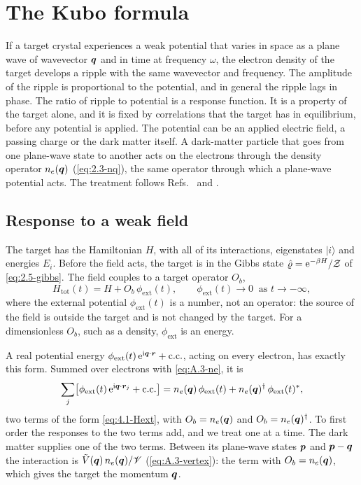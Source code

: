 \section{The Kubo formula}\label{sec:4.1}

If a target crystal experiences a weak potential that varies in space as a plane wave of wavevector $\bm{q}$ and in time at frequency $\omega$, the electron density of the target develops a ripple with the same wavevector and frequency. The amplitude of the ripple is proportional to the potential, and in general the ripple lags in phase. The ratio of ripple to potential is a response function. It is a property of the target alone, and it is fixed by correlations that the target has in equilibrium, before any potential is applied. The potential can be an applied electric field, a passing charge or the dark matter itself. A dark-matter particle that goes from one plane-wave state to another acts on the electrons through the density operator $n_e(\bm{q})$ (\cref{eq:2.3-nq}), the same operator through which a plane-wave potential acts. The treatment follows Refs.~\cite[Chap.~3]{giuliani2005quantum} and \cite[Chap.~6]{bruus2004many}.

\subsection{Response to a weak field}

The target has the Hamiltonian $H$, with all of its interactions, eigenstates $|i\rangle$ and energies $E_i$. Before the field acts, the target is in the Gibbs state $\hat{\varrho} = \mathrm{e}^{-\beta H}/\mathcal{Z}$ of \cref{eq:2.5-gibbs}. The field couples to a target operator $O_b$,
\begin{equation}
  H_{\mathrm{tot}}(t) = H + O_b\,\phi_{\mathrm{ext}}(t), \qquad \phi_{\mathrm{ext}}(t) \to 0 \ \text{ as } t \to -\infty ,
  \label{eq:4.1-Hext}
\end{equation}
where the external potential $\phi_{\mathrm{ext}}(t)$ is a number, not an operator: the source of the field is outside the target and is not changed by the target. For a dimensionless $O_b$, such as a density, $\phi_{\mathrm{ext}}$ is an energy.

A real potential energy $\phi_{\mathrm{ext}}(t)\,\mathrm{e}^{\mathrm{i}\bm{q}\cdot\bm{r}} + \text{c.c.}$, acting on every electron, has exactly this form. Summed over electrons with \cref{eq:A.3-ne}, it is
\begin{equation*}
  \sum_j\bigl[\phi_{\mathrm{ext}}(t)\,\mathrm{e}^{\mathrm{i}\bm{q}\cdot\bm{r}_j} + \text{c.c.}\bigr] = n_e(\bm{q})\,\phi_{\mathrm{ext}}(t) + n_e(\bm{q})^\dagger\,\phi_{\mathrm{ext}}(t)^* ,
\end{equation*}
two terms of the form \cref{eq:4.1-Hext}, with $O_b = n_e(\bm{q})$ and $O_b = n_e(\bm{q})^\dagger$. To first order the responses to the two terms add, and we treat one at a time. The dark matter supplies one of the two terms. Between its plane-wave states $\bm{p}$ and $\bm{p} - \bm{q}$ the interaction is $\tilde V(\bm{q})\,n_e(\bm{q})/\mathscr{V}$ (\cref{eq:A.3-vertex}): the term with $O_b = n_e(\bm{q})$, which gives the target the momentum $\bm{q}$.

